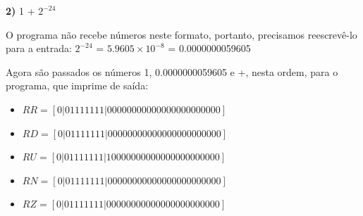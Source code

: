 \documentclass[11pt]{article}
\begin{document}
\textbf{2)} 1 + $ 2^{-24} $

O programa não recebe números neste formato, portanto, precisamos reescrevê-lo para a entrada:
$ 2^{-24} $ = $ 5.9605 \times 10^{-8} $ = 0.0000000059605

Agora são passados os números 1, 0.0000000059605 e +, nesta ordem, para o programa, que imprime de saída:

\begin{itemize}
  \item {\small$ RR = [ 0 | 0 1 1 1 1 1 1 1 | 0 0 0 0 0 0 0 0 0 0 0 0 0 0 0 0 0 0 0 0 0 0 0 ] $}
  \item {\small$ RD = [ 0 | 0 1 1 1 1 1 1 1 | 0 0 0 0 0 0 0 0 0 0 0 0 0 0 0 0 0 0 0 0 0 0 0 ] $}
  \item {\small$ RU = [ 0 | 0 1 1 1 1 1 1 1 | 1 0 0 0 0 0 0 0 0 0 0 0 0 0 0 0 0 0 0 0 0 0 0 ] $}
  \item {\small$ RN = [ 0 | 0 1 1 1 1 1 1 1 | 0 0 0 0 0 0 0 0 0 0 0 0 0 0 0 0 0 0 0 0 0 0 0 ] $}
  \item {\small$ RZ = [ 0 | 0 1 1 1 1 1 1 1 | 0 0 0 0 0 0 0 0 0 0 0 0 0 0 0 0 0 0 0 0 0 0 0 ] $}
\end{itemize}
\end{document}
